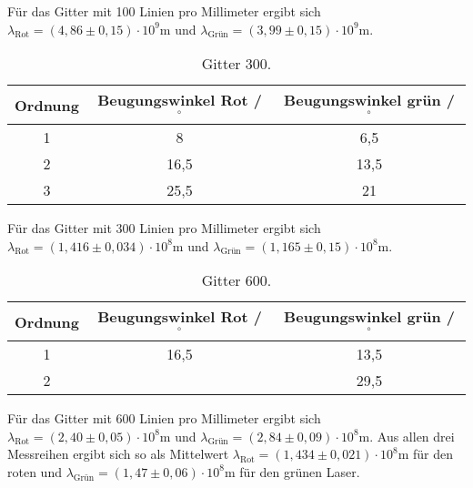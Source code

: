 \noindent
Für das Gitter mit 100 Linien pro Millimeter ergibt sich $\lambda_\text{Rot} = (4,86 \pm 0,15) \cdot 10^9 \si{\meter}$ und
$\lambda_\text{Grün} = (3,99 \pm 0,15) \cdot 10^9 \si{\meter}$.

\begin{table}[H]
  \centering
  \caption{Gitter 300.}
  \label{tab:git300}
  \begin{tabular}{c c c}
    \toprule
    Ordnung & Beugungswinkel Rot / $^{\circ}$ & Beugungswinkel grün / $^{\circ}$\\
    \midrule
    1 & 8 & 6,5\\
    2 & 16,5 & 13,5\\
    3 & 25,5 & 21\\
    \bottomrule
  \end{tabular}
\end{table}

\noindent
Für das Gitter mit 300 Linien pro Millimeter ergibt sich $\lambda_\text{Rot} = (1,416 \pm 0,034) \cdot 10^8 \si{\meter}$ und
$\lambda_\text{Grün} = (1,165 \pm 0,15) \cdot 10^8 \si{\meter}$.

\begin{table}[H]
  \centering
  \caption{Gitter 600.}
  \label{tab:git600}
  \begin{tabular}{c c c}
    \toprule
    Ordnung & Beugungswinkel Rot / $^{\circ}$ & Beugungswinkel grün / $^{\circ}$\\
    \midrule
    1 & 16,5 & 13,5\\
    2 & & 29,5\\
    \bottomrule
  \end{tabular}
\end{table}

\noindent
Für das Gitter mit 600 Linien pro Millimeter ergibt sich $\lambda_\text{Rot} = (2,40 \pm 0,05) \cdot 10^8 \si{\meter}$ und
$\lambda_\text{Grün} = (2,84 \pm 0,09) \cdot 10^8 \si{\meter}$.
\newline \newline
Aus allen drei Messreihen ergibt sich so als Mittelwert $\lambda_\text{Rot} = (1,434 \pm 0,021) \cdot 10^8 \si{\meter}$ für den roten und
$\lambda_\text{Grün} = (1,47 \pm 0,06) \cdot 10^8 \si{\meter}$ für den grünen Laser.